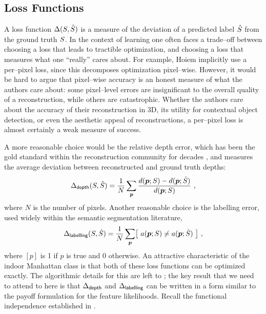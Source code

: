 \subsection{Loss Functions}

A loss function $\Delta(S,\hat{S})$ is a measure of the
deviation of a predicted label $\hat{S}$ from the ground truth
$S$. In the context of learning one often faces a trade--off
between choosing a loss that leads to tractible optimization, and
choosing a loss that measures what one ``really'' cares about. For
example, Hoiem \etal \cite{Hoiem05} implicitly use a per--pixel loss,
since this decomposes optimization pixel--wise. However, it would be
hard to argue that pixel--wise accuracy is an honest measure of what
the authors care about: some pixel--level errors are insignificant to
the overall quality of a reconstruction, while others are
catastrophic. Whether the authors care about the accuracy of their
reconstruction in 3D, its utility for contextual object detection, or
even the aesthetic appeal of reconstructions, a per--pixel loss is
almost certainly a weak measure of success. 

A more reasonable choice would be the relative depth error, which has
been the gold standard within the reconstruction community for decades
\cite{Hartley04}, and measures the average deviation between
reconstructed and ground truth depths:
\begin{equation}
  \Delta_{\textsf{depth}}(S,\hat{S})
  =
  \frac{1}{N}
  \sum_{\boldsymbol{p}}
    \frac
        {d(\boldsymbol{p};S) - d(\boldsymbol{p};\hat{S})}
        {d(\boldsymbol{p};S)} ~,
\end{equation}
where $N$ is the number of pixels. Another reasonable choice is the
labelling error, used widely within the semantic segmentation
literature,
\begin{equation}
  \Delta_{\textsf{labelling}}(S,\hat{S})
  =
  \frac{1}{N}
  \sum_{\boldsymbol{p}}
    \bigl[~a(\boldsymbol{p};S) \neq a(\boldsymbol{p};\hat{S})~\bigr] ~,
\end{equation}
where $[p]$ is 1 if $p$ is true and 0 otherwise. An attractive
characteristic of the indoor Manhattan class is that both of these
loss functions can be optimized exactly. The algorithmic details for
this are left to ; the key result that we need to
attend to here is that $\Delta_{\textsf{depth}}$ and $\Delta_{\textsf{labelling}}$ can be written in a
form similar to the payoff formulation for the feature
likelihoods. Recall the functional independence established in
.

